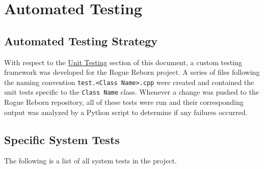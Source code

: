 \documentclass[12pt, titlepage]{article}
\newcommand{\newsection}[1]{
  \newpage
  \section{#1}
}
\begin{document}
\newsection{Automated Testing} \label{Section_Automated}

	\subsection{Automated Testing Strategy}
	With respect to the \hyperref[Section_UT]{Unit Testing} section of this document, a custom testing framework was developed for the Rogue Reborn project.  A series of files following the naming convention \lstinline$test.<Class Name>.cpp$ were created and contained the unit tests specific to the \lstinline$Class Name$ class.  Whenever a change was pushed to the Rogue Reborn repository, all of these tests were run and their corresponding output was analyzed by a Python script to determine if any failures occurred.

	\subsection{Specific System Tests}
	The following is a list of all system tests in the project.
\end{document}
